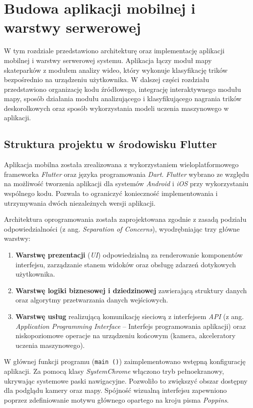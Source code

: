 \newpage    
    \section{Budowa aplikacji mobilnej i warstwy serwerowej}

        W tym rozdziale przedstawiono architekturę oraz implementację aplikacji mobilnej i warstwy serwerowej systemu. Aplikacja łączy moduł mapy skateparków z modułem analizy wideo, który wykonuje klasyfikację trików bezpośrednio na urządzeniu użytkownika. W dalszej części rozdziału przedstawiono organizację kodu źródłowego, integrację interaktywnego modułu mapy,  sposób działania modułu analizującego i klasyfikującego nagrania trików deskorolkowych oraz sposób wykorzystania modeli uczenia maszynowego w aplikacji.

    \subsection{Struktura projektu w środowisku Flutter}
        Aplikacja mobilna została zrealizowana z wykorzystaniem wieloplatformowego frameworka \textit{Flutter} oraz języka programowania \textit{Dart}. \textit{Flutter} wybrano ze względu na możliwość tworzenia aplikacji dla systemów \textit{Android} i \textit{iOS} przy wykorzystaniu wspólnego kodu. Pozwala to ograniczyć konieczność implementowania i utrzymywania dwóch niezależnych wersji aplikacji.

        Architektura oprogramowania została zaprojektowana zgodnie z zasadą podziału odpowiedzialności (z ang. \textit{Separation of Concerns}), wyodrębniając trzy główne warstwy:
        \begin{enumerate}
            \item \textbf{Warstwę prezentacji} (\textit{UI}) odpowiedzialną za renderowanie komponentów interfejsu, zarządzanie stanem widoków oraz obsługę zdarzeń dotykowych użytkownika.
            \item \textbf{Warstwę logiki biznesowej i dziedzinowej} zawierającą struktury danych oraz algorytmy przetwarzania danych wejściowych.
            \item \textbf{Warstwę usług} realizującą komunikację sieciową z interfejsem \textit{API} (z ang. \textit{Application Programming Interface} – Interfejs programowania aplikacji) oraz niskopoziomowe operacje na urządzeniu końcowym (kamera, akceleratory uczenia maszynowego).
        \end{enumerate}

        W głównej funkcji programu (\texttt{main ()}) zaimplementowano wstępną konfigurację aplikacji. Za pomocą klasy \textit{SystemChrome} włączono tryb pełnoekranowy, ukrywając systemowe paski nawigacyjne. Pozwoliło to zwiększyć obszar dostępny dla podglądu kamery oraz mapy. Spójność wizualną interfejsu zapewniono poprzez zdefiniowanie motywu głównego opartego na kroju pisma \textit{Poppins}.

